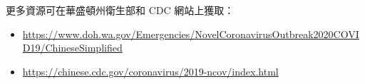 \documentclass[10pt]{article}
\begin{document}
更多資源可在華盛頓州衛生部和 CDC 網站上獲取：

\begin{itemize}
\item

  \url{https://www.doh.wa.gov/Emergencies/NovelCoronavirusOutbreak2020COVID19/ChineseSimplified}

\item

  \url{https://chinese.cdc.gov/coronavirus/2019-ncov/index.html}

\end{itemize}
\end{document}
